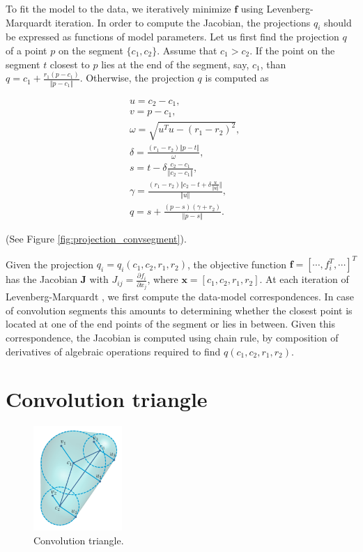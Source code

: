 \documentclass[10pt,journal,a4paper]{IEEEtran}
\begin{document}
To fit the model to the data, we iteratively minimize $\textbf{f}$ using Levenberg-Marquardt iteration. In order to compute the Jacobian, the projections $q_i$ should be expressed as functions of model parameters. Let us first find the projection $q$ of a point $p$ on the segment $\{c_1, c_2\}$. Assume that $c_1 > c_2$. If the point on the segment $t$ closest to $p$ lies at the end of the segment, say, $c_1$, than $q = c_1 + \frac{r_1  (p - c_1)}{\Vert p - c_1 \Vert}$. 
Otherwise, the projection $q$ is computed as 

\begin{align*}
& u = c_2 - c_1, \\
& v = p - c_1, \\
& \omega = \sqrt{u^T u - (r_1 - r_2)^2}, \\
&  \delta =  \frac{(r_1 - r_2) \Vert p - t \Vert}{\omega}, \\
&   s = t - \delta  \frac{c_2 - c_1} {\Vert c_2 - c_1 \Vert}, \\
&  \gamma = \frac{(r_1 - r_2)   {\Vert c_2 - t + \delta  \frac{u} {\Vert u \Vert}} \Vert} {\Vert u \Vert}, \\
&   q = s +\frac{ (p - s) (\gamma + r_2) }{ \Vert p - s \Vert } .
\end{align*}

(See Figure \ref{fig:projection_convsegment}).

Given the projection $q_i = q_i(c_1, c_2, r_1, r_2)$, the objective function $\textbf{f} = [\cdots, f_i^T, \cdots]^T$  has the Jacobian $\textbf{J}$ with $J_{ij} = \frac{\partial{f_i}}{\partial{x_j}}$, where $\textbf{x} = [c_1, c_2, r_1, r_2]$.  At each iteration of Levenberg-Marquardt , we first compute the data-model correspondences. In case of convolution segments this amounts to determining whether the closest point is located at one of the end points of the segment or lies in between. Given this correspondence, the Jacobian is computed using chain rule, by composition of derivatives of algebraic operations required to find $q(c_1, c_2, r_1, r_2)$.




\section{Convolution triangle}


\begin{figure}[h!] 
	\centering
	\hspace{-2em}
	\includegraphics[width=0.3\textwidth]{fig/convtriangle.png}
	\caption{Convolution triangle.}
	\label{fig:convtriangle}
\end{figure}
\end{document}
